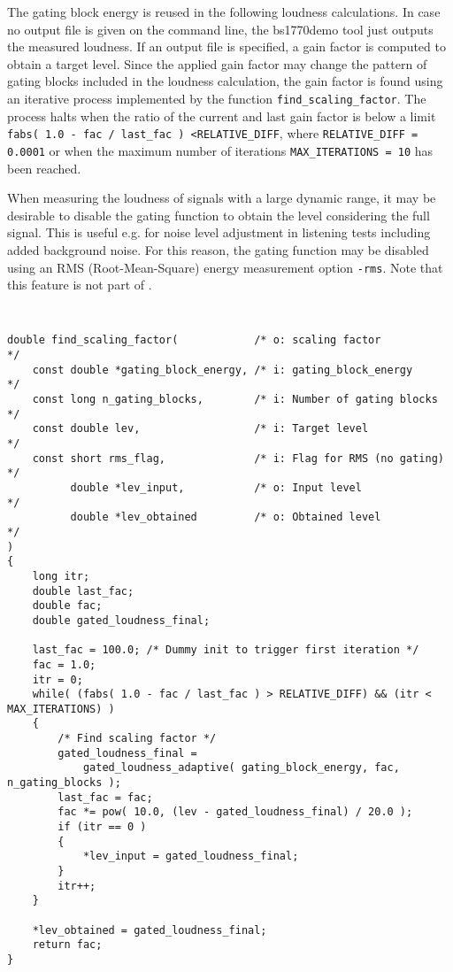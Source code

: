 The gating block energy is reused in the following loudness calculations. In case no output file is given on
the command line, the bs1770demo tool just outputs the measured loudness. If an output file is specified, a gain
factor is computed to obtain a target level. Since the applied gain factor may change the pattern of gating blocks
included in the loudness calculation, the gain factor is found using an iterative process implemented by the function
\texttt{find\_scaling\_factor}. The process halts when the ratio of the current and last gain factor is below a limit
\texttt{fabs( 1.0 - fac / last\_fac ) \textless RELATIVE\_DIFF}, where \texttt{RELATIVE\_DIFF = 0.0001} or when the maximum number of iterations \texttt{MAX\_ITERATIONS = 10}
has been reached.

When measuring the loudness of signals with a large dynamic range, it may be desirable to disable the gating function
to obtain the level considering the full signal. This is useful e.g. for noise level adjustment in listening tests
including added background noise. For this reason, the gating function may be disabled using an RMS (Root-Mean-Square)
energy measurement option \texttt{-rms}. Note that this feature is not part of \cite{BS1770}.

{\tt\small
\begin{verbatim}
double find_scaling_factor(            /* o: scaling factor                 */
    const double *gating_block_energy, /* i: gating_block_energy            */
    const long n_gating_blocks,        /* i: Number of gating blocks        */
    const double lev,                  /* i: Target level                   */
    const short rms_flag,              /* i: Flag for RMS (no gating)       */    
          double *lev_input,           /* o: Input level                    */
          double *lev_obtained         /* o: Obtained level                 */
)
{
    long itr;
    double last_fac;
    double fac;
    double gated_loudness_final;

    last_fac = 100.0; /* Dummy init to trigger first iteration */
    fac = 1.0;
    itr = 0;
    while( (fabs( 1.0 - fac / last_fac ) > RELATIVE_DIFF) && (itr < MAX_ITERATIONS) )
    {
        /* Find scaling factor */
        gated_loudness_final = 
            gated_loudness_adaptive( gating_block_energy, fac, n_gating_blocks );
        last_fac = fac;
        fac *= pow( 10.0, (lev - gated_loudness_final) / 20.0 );
        if (itr == 0 )
        {
            *lev_input = gated_loudness_final;
        }
        itr++;
    }

    *lev_obtained = gated_loudness_final;
    return fac;
}
\end{verbatim}
}






